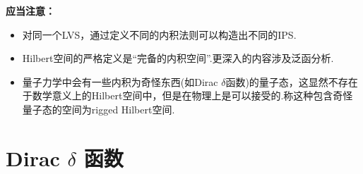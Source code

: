 \begin{extension}{}
    \textbf{应当注意：}
    \begin{itemize}
        \item 对同一个LVS，通过定义不同的内积法则可以构造出不同的IPS.
        \item Hilbert空间的严格定义是“完备的内积空间”.更深入的内容涉及泛函分析.
        \item 量子力学中会有一些内积为奇怪东西(如Dirac $\delta$函数)的量子态，这显然不存在于数学意义上的Hilbert空间中，但是在物理上是可以接受的.称这种包含奇怪量子态的空间为rigged Hilbert空间.
    \end{itemize}
\end{extension}


\section{Dirac \texorpdfstring{$\delta$}{delta} 函数}
